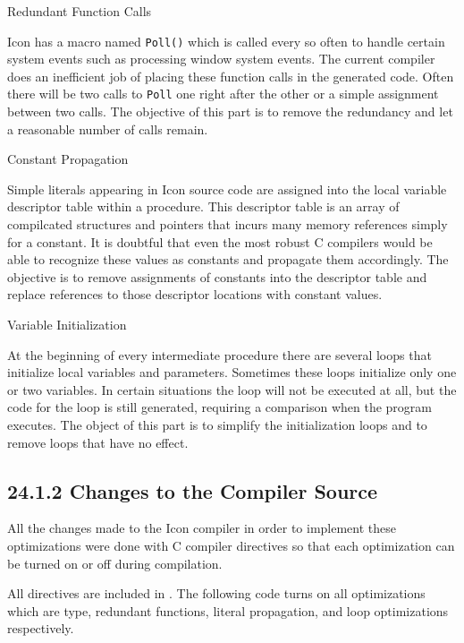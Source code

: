 {\sffamily Redundant Function Calls}

Icon has a macro named \texttt{Poll()} which is called every so often
to handle certain system events such as processing window system
events. The current compiler does an inefficient job of placing these
function calls in the generated code. Often there will be two calls to
\texttt{Poll} one right after the other or a simple assignment between
two calls. The objective of this part is to remove the redundancy and
let a reasonable number of calls remain.

{\sffamily Constant Propagation}

Simple literals appearing in Icon source code are assigned into the
local variable descriptor table within a procedure. This descriptor
table is an array of compilcated structures and pointers that incurs
many memory references simply for a constant. It is doubtful that
even the most robust C compilers would be able to recognize these
values as constants and propagate them accordingly. The objective is
to remove assignments of constants into the descriptor table and
replace references to those descriptor locations with constant values.

{\sffamily Variable Initialization}

At the beginning of every intermediate procedure there are several
loops that initialize local variables and parameters.  Sometimes these
loops initialize only one or two variables. In certain situations the
loop will not be executed at all, but the code for the loop is still
generated, requiring a comparison when the program executes. The
object of this part is to simplify the initialization loops and to
remove loops that have no effect.

\subsection[24.1.2 Changes to the Compiler Source]{24.1.2 Changes to the Compiler Source}

All the changes made to the Icon compiler in order to implement these
optimizations were done with C compiler directives so that each
optimization can be turned on or off during compilation.

All directives are included in . The following
code turns on all optimizations which are type, redundant functions,
literal propagation, and loop optimizations respectively.

